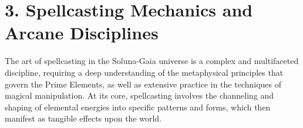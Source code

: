 \documentclass[12pt]{article}
\begin{document}
% 
% 
% 
% 

\section{3. Spellcasting Mechanics and Arcane Disciplines}

The art of spellcasting in the Soluna-Gaia universe is a complex and multifaceted discipline, requiring a deep understanding of the metaphysical principles that govern the Prime Elements, as well as extensive practice in the techniques of magical manipulation. At its core, spellcasting involves the channeling and shaping of elemental energies into specific patterns and forms, which then manifest as tangible effects upon the world.
\end{document}
